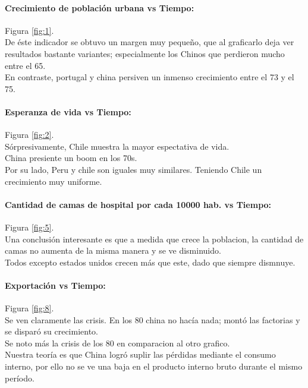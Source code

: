 \documentclass{article}
\begin{document}
\paragraph{Crecimiento de población urbana vs Tiempo:}
Figura \ref{fig:1}.\\
De éste indicador se obtuvo un margen muy pequeño, que al graficarlo deja ver resultados bastante variantes; especialmente los Chinos que perdieron mucho entre el 65.\\
En contraste, portugal y china persiven un inmenso crecimiento entre el 73 y el 75.\\


\paragraph{Esperanza de vida vs Tiempo:}
Figura \ref{fig:2}.\\
Sórpresivamente, Chile muestra la mayor espectativa de vida.\\
China presiente un boom en los 70s.\\
Por su lado, Peru y chile son iguales muy similares. Teniendo Chile un crecimiento muy uniforme.\\


\paragraph{Cantidad de camas de hospital por cada 10000 hab. vs Tiempo:}
Figura \ref{fig:5}.\\
Una conclusión interesante es que a medida que crece la poblacion, la cantidad de camas no aumenta de la misma manera y se ve disminuido.\\
Todos excepto estados unidos crecen más que este, dado que siempre dismnuye.

\paragraph{Exportación vs Tiempo:}
Figura \ref{fig:8}.\\
Se ven claramente las crisis. En los 80 china no hacía nada; montó las factorias y se disparó su crecimiento.\\
Se noto más la crisis de los 80 en comparacion al otro grafico. \\

Nuestra teoría es que China logró suplir las pérdidas mediante el consumo interno, por ello no se ve una baja en el producto interno bruto durante el mismo período.
\end{document}
